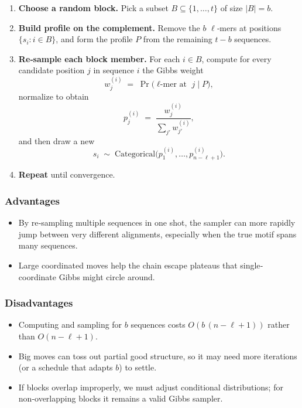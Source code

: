 \documentclass{article}
\begin{document}
\begin{enumerate}
  \item \textbf{Choose a random block.}  
    Pick a subset \(B\subseteq\{1,\dots,t\}\) of size \(\lvert B\rvert = b\).
  \item \textbf{Build profile on the complement.}  
    Remove the \(b\) \(\ell\)‑mers at positions \(\{s_i : i\in B\}\), and form the profile \(P\) from the remaining \(t-b\) sequences.
  \item \textbf{Re‑sample each block member.}  
    For each \(i\in B\), compute for every candidate position \(j\) in sequence \(i\) the Gibbs weight
    \[
      w^{(i)}_j \;=\;\Pr\bigl(\text{$\ell$‑mer at }j \mid P\bigr),
    \]
    normalize to obtain
    \[
      p^{(i)}_j \;=\;\frac{w^{(i)}_j}{\sum_{j'} w^{(i)}_{j'}},
    \]
    and then draw a new
    \[
      s_i \;\sim\;\mathrm{Categorical}\bigl(p^{(i)}_1,\dots,p^{(i)}_{n-\ell+1}\bigr).
    \]
  \item \textbf{Repeat} until convergence.
\end{enumerate}

\subsubsection*{Advantages}
\begin{itemize}
  \item  By re‑sampling multiple sequences in one shot, the sampler can more rapidly jump between very different alignments, especially when the true motif spans many sequences.
  \item  Large coordinated moves help the chain escape plateaus that single‐coordinate Gibbs might circle around.
\end{itemize}

\subsubsection*{Disadvantages}
\begin{itemize}
  \item Computing and sampling for \(b\) sequences costs \(O(b\,(n-\ell+1))\) rather than \(O(n-\ell+1)\).
  \item  Big moves can toss out partial good structure, so it may need more iterations (or a schedule that adapts \(b\)) to settle.
  \item  If blocks overlap improperly, we must adjust conditional distributions; for non‐overlapping blocks it remains a valid Gibbs sampler.
\end{itemize}
\end{document}
